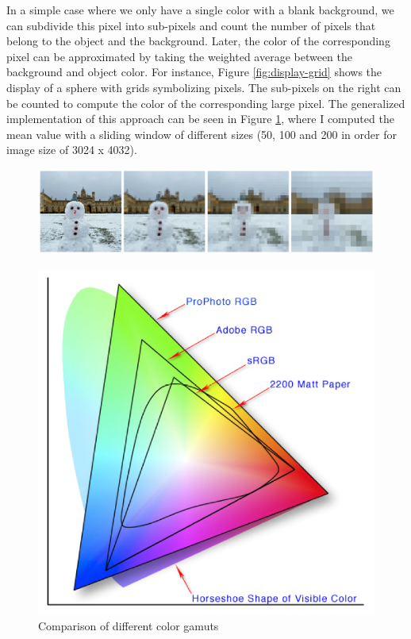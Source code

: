 In a simple case where we only have a single color with a blank background, we can subdivide this pixel into sub-pixels and count the number of pixels that belong to the object and the background. Later, the color of the corresponding pixel can be approximated by taking the weighted average between the background and object color. For instance, Figure \ref{fig:display-grid} shows the display of a sphere with grids symbolizing pixels. The sub-pixels on the right can be counted to compute the color of the corresponding large pixel. The generalized implementation of this approach can be seen in Figure \ref{fig:color-approximate}, where I computed the mean value with a sliding window of different sizes (50, 100 and 200 in order for image size of 3024 x 4032).




\begin{figure}
  \centering

    \includegraphics[width=0.9\linewidth]{Images/pixelate_image_snowman.png}

   \caption{}
   \label{fig:color-approximate}
\end{figure}


\begin{figure}
\includegraphics[width=0.9\linewidth]{Images/Colorspace.png}
\caption{Comparison of different color gamuts \cite{schewe2007color}}\label{fig:color-gamut}
    
\end{figure} 


